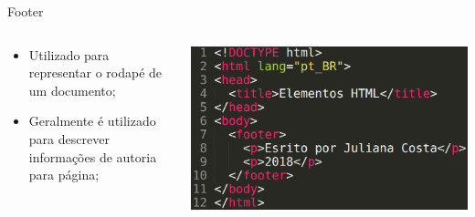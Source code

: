 \documentclass{beamer}
\begin{document}
\begin{frame}{Footer}
    \begin{columns}
    \begin{column}{0.4 \textwidth}
      \small
     \begin{itemize}
      \item Utilizado para representar o rodapé de um documento;
       \item Geralmente é utilizado para descrever informações de autoria 
para página;
     \end{itemize}
    \end{column}
    
    \begin{column}{0.55\textwidth}
     \includegraphics[height=0.4\paperheight]{fig/aula2/aula4_2.png}
    \end{column}
  \end{columns}
\end{frame}
\end{document}
